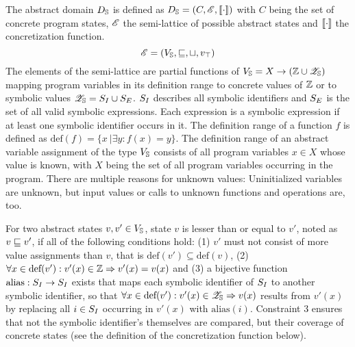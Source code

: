 The abstract domain $D_{\mathbb{S}}$ is defined as
$D_{\mathbb{S}} = (C, \mathscr{E}, [\![ \cdot ]\!] )$
with $C$ being the set of concrete program states, $\mathscr{E}$ the semi-lattice of possible abstract states and $[\![ \cdot ]\!]$ the concretization function.
\[\mathscr{E} = (V_{\mathbb{S}},
                  \sqsubseteq, 
                  \sqcup, 
                  v_\top
                )        
\]
The elements of the semi-lattice are partial functions of $V_{\mathbb{S}} = X \rightarrow (\mathbb{Z} \cup \mathscr{Z}_{\mathbb{S}})$ mapping program variables in its definition range to concrete values of $\mathbb{Z}$
or to symbolic values $\mathscr{Z}_{\mathbb{S}} = S_I \cup S_E$.
$S_I$ describes all symbolic identifiers and
$S_E$ is the set of all valid symbolic expressions. Each expression is a symbolic expression if at least one symbolic identifier occurs in it.
The definition range of a function $f$ is defined as $\text{def}(f) = \{x\ | \exists y: f(x) = y\}$. The definition range of an abstract variable assignment of the type $V_{\mathbb{S}}$ consists of all program variables $x \in X$ whose value is known, with $X$ being the set of all program variables occurring in the program. There are multiple reasons for unknown values: Uninitialized variables are unknown, but input values or calls to unknown functions and operations are, too.

For two abstract states $v, v' \in V_{\mathbb{S}}$, state $v$ is lesser than or equal to $v'$, noted as $v \sqsubseteq v'$, if all of the following conditions hold:
(1) $v'$ must not consist of more value assignments than $v$, that is $\text{def}(v') \subseteq \text{def}(v)$,
(2) $\forall x \in \text{def}(v'): v'(x) \in \mathbb{Z} \Rightarrow v'(x) = v(x)$ and
(3) a bijective function $\text{alias}:S_I \rightarrow S_I$ exists
that maps each symbolic identifier of $S_I$ to another symbolic identifier,
so that $\forall x \in \text{def}(v'): v'(x) \in \mathscr{Z}_{\mathbb{S}} \Rightarrow v(x)$ results from $v'(x)$ by replacing all $i \in S_I$ occurring in $v'(x)$ with $\text{alias}(i)$.
Constraint 3 ensures that not the symbolic identifier's themselves are compared, but their coverage of concrete states (see the definition of the concretization function below).


